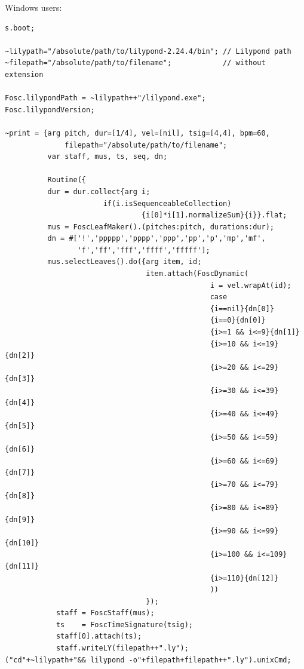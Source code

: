 \begin{enumerate}
\pagebreak

Windows users:

\begin{lstlisting}[frame=single] 
s.boot;

~lilypath="/absolute/path/to/lilypond-2.24.4/bin"; // Lilypond path
~filepath="/absolute/path/to/filename";            // without extension

Fosc.lilypondPath = ~lilypath++"/lilypond.exe";
Fosc.lilypondVersion;

~print = {arg pitch, dur=[1/4], vel=[nil], tsig=[4,4], bpm=60, 
              filepath="/absolute/path/to/filename"; 
          var staff, mus, ts, seq, dn;
          
          Routine({
          dur = dur.collect{arg i;
                       if(i.isSequenceableCollection)
                                {i[0]*i[1].normalizeSum}{i}}.flat;  
          mus = FoscLeafMaker().(pitches:pitch, durations:dur);
          dn = #['!','ppppp','pppp','ppp','pp','p','mp','mf',
                 'f','ff','fff','ffff','fffff'];
          mus.selectLeaves().do({arg item, id; 
                                 item.attach(FoscDynamic(
                                                i = vel.wrapAt(id);
                                                case
                                                {i==nil}{dn[0]}
                                                {i==0}{dn[0]}
                                                {i>=1 && i<=9}{dn[1]}
                                                {i>=10 && i<=19}{dn[2]}
                                                {i>=20 && i<=29}{dn[3]}
                                                {i>=30 && i<=39}{dn[4]}
                                                {i>=40 && i<=49}{dn[5]}
                                                {i>=50 && i<=59}{dn[6]}
                                                {i>=60 && i<=69}{dn[7]}
                                                {i>=70 && i<=79}{dn[8]}
                                                {i>=80 && i<=89}{dn[9]}
                                                {i>=90 && i<=99}{dn[10]}
                                                {i>=100 && i<=109}{dn[11]}
                                                {i>=110}{dn[12]}              
                                                ))
                                 });
            staff = FoscStaff(mus);
            ts    = FoscTimeSignature(tsig);
            staff[0].attach(ts);
            staff.writeLY(filepath++".ly");
("cd"+~lilypath+"&& lilypond -o"+filepath+filepath++".ly").unixCmd;

\end{lstlisting}
\end{enumerate}
